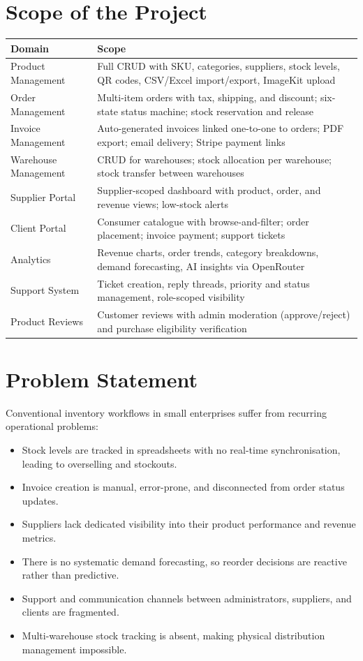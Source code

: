 \documentclass[12pt,a4paper]{report}
\begin{document}
\section{Scope of the Project}

\begin{longtable}{p{}p{}}
    \toprule
    \textbf{Domain} & \textbf{Scope} \\
    \midrule
    \endhead
    Product Management & Full CRUD with SKU, categories, suppliers, stock levels, QR codes, CSV/Excel import/export, ImageKit upload \\
    Order Management & Multi-item orders with tax, shipping, and discount; six-state status machine; stock reservation and release \\
    Invoice Management & Auto-generated invoices linked one-to-one to orders; PDF export; email delivery; Stripe payment links \\
    Warehouse Management & CRUD for warehouses; stock allocation per warehouse; stock transfer between warehouses \\
    Supplier Portal & Supplier-scoped dashboard with product, order, and revenue views; low-stock alerts \\
    Client Portal & Consumer catalogue with browse-and-filter; order placement; invoice payment; support tickets \\
    Analytics & Revenue charts, order trends, category breakdowns, demand forecasting, AI insights via OpenRouter \\
    Support System & Ticket creation, reply threads, priority and status management, role-scoped visibility \\
    Product Reviews & Customer reviews with admin moderation (approve/reject) and purchase eligibility verification \\
    \bottomrule
\end{longtable}

\section{Problem Statement}

Conventional inventory workflows in small enterprises suffer from recurring operational problems:
\begin{itemize}
    \item Stock levels are tracked in spreadsheets with no real-time synchronisation, leading to overselling and stockouts.
    \item Invoice creation is manual, error-prone, and disconnected from order status updates.
    \item Suppliers lack dedicated visibility into their product performance and revenue metrics.
    \item There is no systematic demand forecasting, so reorder decisions are reactive rather than predictive.
    \item Support and communication channels between administrators, suppliers, and clients are fragmented.
    \item Multi-warehouse stock tracking is absent, making physical distribution management impossible.
\end{itemize}
\end{document}
